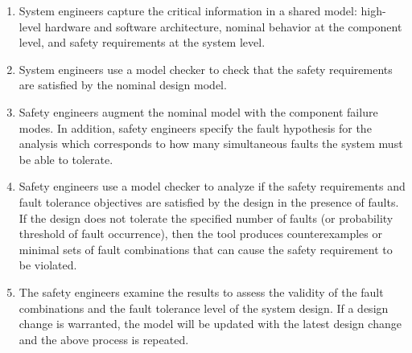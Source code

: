 \begin{enumerate}
	\item System engineers capture the critical information in a shared model:  high-level hardware and software architecture, nominal behavior at the component level, and safety requirements at the system level.
	\item System engineers use a model checker to check that the safety requirements are satisfied by the nominal design model. 
	\item Safety engineers augment the nominal model with the component failure modes. In addition, safety engineers specify the fault hypothesis for the analysis which corresponds to how many simultaneous faults the system must be able to tolerate.
	\item Safety engineers use a model checker to analyze if the safety requirements and fault tolerance objectives are satisfied by the design in the presence of faults. If the design does not tolerate the specified number of faults (or probability threshold of fault occurrence), then the tool produces counterexamples or minimal sets of fault combinations that can cause the safety requirement to be violated.
	\item The safety engineers examine the results to assess the validity of the fault combinations and the fault tolerance level of the system design. If a design change is warranted, the model will be updated with the latest design change and the above process is repeated.
\end{enumerate}




